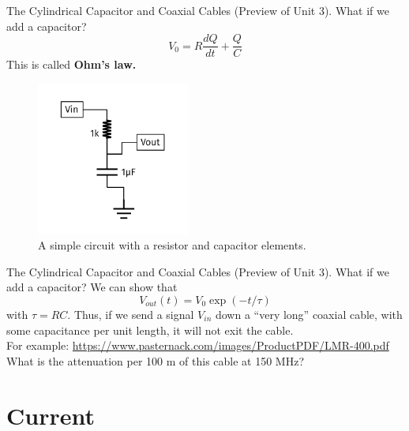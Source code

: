 \documentclass{beamer}
\begin{document}
\begin{frame}{The Cylindrical Capacitor and Coaxial Cables}
(Preview of Unit 3).  What if we add a capacitor?
\begin{equation}
V_0 = R \frac{dQ}{dt} +\frac{Q}{C}
\end{equation}
This is called \textbf{Ohm's law.}
\begin{figure}
\centering
\includegraphics[width=0.45\textwidth]{figures/iVCurve8.pdf}
\caption{\label{fig:iv2} A simple circuit with a resistor and capacitor elements.}
\end{figure}
\end{frame}

\begin{frame}{The Cylindrical Capacitor and Coaxial Cables}
(Preview of Unit 3).  What if we add a capacitor?
We can show that
\begin{equation}
V_{out}(t) = V_0 \exp(-t/\tau)
\end{equation}
with $\tau = RC$.  Thus, if we send a signal $V_{in}$ down a ``very long'' coaxial cable, with some capacitance per unit length, it will not exit the cable. \\ \vspace{0.5cm}
For example: \url{https://www.pasternack.com/images/ProductPDF/LMR-400.pdf} \\ \vspace{0.5cm}
What is the attenuation per 100 m of this cable at 150 MHz?
\end{frame}

\section{Current}
\end{document}
